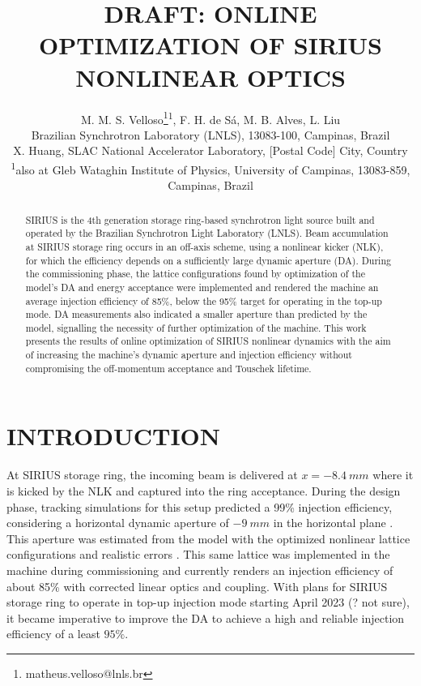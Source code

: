 \documentclass[a4paper,
               keeplastbox,   %
               ]{jacow}
\begin{document}
\title{DRAFT: ONLINE OPTIMIZATION OF SIRIUS NONLINEAR OPTICS}

\author{M. M. S. Velloso\thanks{matheus.velloso@lnls.br}\textsuperscript{1}, F. H. de Sá, M. B. Alves, L. Liu\\ Brazilian Synchrotron Laboratory (LNLS), 13083-100, Campinas, Brazil \\
		X. Huang, SLAC National Accelerator Laboratory, [Postal Code] City, Country \\
		\textsuperscript{1}also at Gleb Wataghin Institute of Physics, University of Campinas, 13083-859, Campinas, Brazil 
}
	
\maketitle
%
\begin{abstract}
SIRIUS is the 4th generation storage ring-based synchrotron light source built and operated by the Brazilian Synchrotron Light Laboratory (LNLS). Beam accumulation at SIRIUS storage ring occurs in an off-axis scheme, using a nonlinear kicker (NLK), for which the efficiency depends on a sufficiently large dynamic aperture (DA). During the commissioning phase, the lattice configurations found by optimization of the model's DA and energy acceptance were implemented and rendered the machine an average injection efficiency of 85\%,  below the 95\% target for operating in the top-up mode. DA measurements also indicated a smaller aperture than predicted by the model, signalling the necessity of further optimization of the machine. This work presents the results of online optimization of SIRIUS nonlinear dynamics with the aim of increasing the machine's dynamic aperture and injection efficiency without compromising the off-momentum acceptance and Touschek lifetime. 
\end{abstract}


\section{INTRODUCTION}
At SIRIUS storage ring, the incoming beam is delivered at $x=-8.4~\unit{mm}$ where it is kicked by the NLK and captured into the ring acceptance. During the design phase, tracking simulations for this setup predicted a 99\% injection efficiency, considering a horizontal dynamic aperture of $-9~\unit{mm}$ in the horizontal plane \cite{Liu:IPAC2016-THPMR011}. This aperture was estimated from the model with the optimized nonlinear lattice configurations and realistic errors \cite{deSá:IPAC2016-THPMR012}. This same lattice was implemented in the machine during commissioning and currently renders an injection efficiency of about 85\% with corrected linear optics and coupling. With plans for SIRIUS storage ring to operate in top-up injection mode starting April 2023 (? not sure), it became imperative to improve the DA to achieve a high and reliable injection efficiency of a least $95\%$. 
\end{document}
